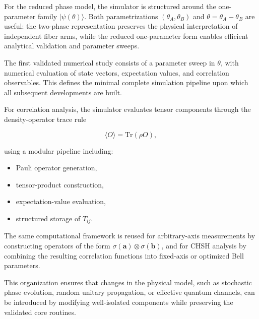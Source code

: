 \medskip

For the reduced phase model, the simulator is structured around the one-parameter family \( |\psi(\theta)\rangle \). Both parametrizations \( (\theta_A,\theta_B) \) and \( \theta = \theta_A-\theta_B \) are useful: the two-phase representation preserves the physical interpretation of independent fiber arms, while the reduced one-parameter form enables efficient analytical validation and parameter sweeps.

\medskip

The first validated numerical study consists of a parameter sweep in \( \theta \), with numerical evaluation of state vectors, expectation values, and correlation observables. This defines the minimal complete simulation pipeline upon which all subsequent developments are built.

\medskip

For correlation analysis, the simulator evaluates tensor components through the density-operator trace rule

\[
\langle O \rangle = \mathrm{Tr}(\rho O),
\]

using a modular pipeline including:
\begin{itemize}
    \item Pauli operator generation,
    \item tensor-product construction,
    \item expectation-value evaluation,
    \item structured storage of \( T_{ij} \).
\end{itemize}

\medskip

The same computational framework is reused for arbitrary-axis measurements by constructing operators of the form \( \sigma(\mathbf{a}) \otimes \sigma(\mathbf{b}) \), and for CHSH analysis by combining the resulting correlation functions into fixed-axis or optimized Bell parameters.

\medskip

This organization ensures that changes in the physical model, such as stochastic phase evolution, random unitary propagation, or effective quantum channels, can be introduced by modifying well-isolated components while preserving the validated core routines.